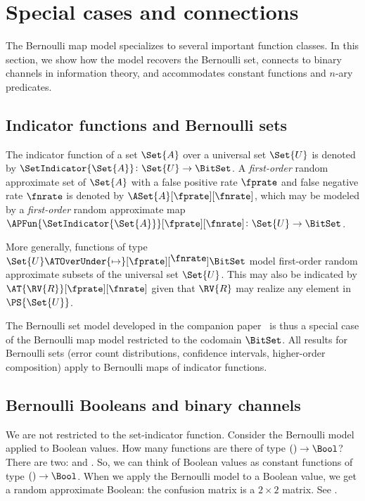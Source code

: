 \documentclass[ ../main.tex]{subfiles}
\begin{document}
\section{Special cases and connections}
\label{sec:special}

The Bernoulli map model specializes to several important function classes.
In this section, we show how the model recovers the Bernoulli set, connects to binary channels in information theory, and accommodates constant functions and $n$-ary predicates.

\subsection{Indicator functions and Bernoulli sets}
\label{sec:indicator}

The indicator function of a set $\Set{A}$ over a universal set $\Set{U}$ is denoted by $\SetIndicator{\Set{A}} \colon \Set{U} \to \BitSet$.
A \emph{first-order} random approximate set of $\Set{A}$ with a false positive rate $\fprate$ and false negative rate $\fnrate$ is denoted by $\ASet{A}[\fprate][\fnrate]$, which may be modeled by a \emph{first-order} random approximate map $\APFun{\SetIndicator{\Set{A}}}[\fprate][\fnrate] \colon \Set{U} \to \BitSet$.

More generally, functions of type $\Set{U} \ATOverUnder{\mapsto}[\fprate][\text{\raisebox{3pt}{$\fnrate$}}] \BitSet$ model first-order random approximate subsets of the universal set $\Set{U}$.
This may also be indicated by $\AT{\RV{R}}[\fprate][\fnrate]$ given that $\RV{R}$ may realize any element in $\PS{\Set{U}}$.

\begin{remark}
The Bernoulli set model developed in the companion paper~\cite{aset} is thus a special case of the Bernoulli map model restricted to the codomain $\BitSet$.
All results for Bernoulli sets (error count distributions, confidence intervals, higher-order composition) apply to Bernoulli maps of indicator functions.
\end{remark}

\subsection{Bernoulli Booleans and binary channels}
\label{sec:bernoulli-bool}

We are not restricted to the set-indicator function. Consider the Bernoulli model applied to Boolean values.
How many functions are there of type $() \to \Bool$? There are two: \True and \False.
So, we can think of Boolean values as constant functions of type $() \to \Bool$.
When we apply the Bernoulli model to a Boolean value, we get a random approximate Boolean: the confusion matrix is a $2 \times 2$ matrix.
See .
\end{document}
